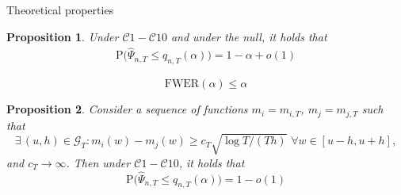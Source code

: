 \documentclass[10pt, handout]{beamer}
\newcommand{\Prob}{\mathrm{P}}
\newtheorem{prop}{Proposition}
\begin{document}
\begin{frame}{Theoretical properties}
\begin{prop} Under $\mathcal{C}1 - \mathcal{C}10$ and under the null, it holds that 
\vspace{-2mm}
\begin{align*}
\Prob\Big(\widehat{\Psi}_{n, T} \leq q_{n, T}(\alpha)\Big) = 1 - \alpha + o(1)
\end{align*}
\vspace{-5mm}
\end{prop} \pause
\begin{corollary} $$\text{FWER}(\alpha)\leq \alpha$$
\end{corollary} \pause
\begin{prop}\label{prop2}
Consider a sequence of functions $m_{i} = m_{i,T}$, $m_{j} = m_{j, T}$ such that 
\begin{equation*}
\exists \, (u, h)\in \mathcal{G}_{T}:  m_{i}(w) - m_{j}(w) \ge c_T \sqrt{\log T / (T h)} \,\, \forall w \in [u-h, u+h],
\end{equation*} and $c_T \rightarrow \infty$. Then under $\mathcal{C}1 - \mathcal{C}10$, it holds that
\vspace{-2mm}
\begin{equation*}
\Prob\Big( \widehat{\Psi}_{n, T} \leq q_{n, T}(\alpha)\Big) = 1 - o(1)
\end{equation*}
\vspace{-5mm}
\end{prop}
\end{frame}
\end{document}
